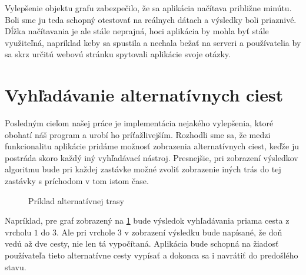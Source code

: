 Vylepšenie objektu grafu zabezpečilo, že sa aplikácia načítava približne minútu. Boli sme ju teda schopný otestovať na reálnych dátach a výsledky boli priaznivé. Dĺžka načítavania je ale stále neprajná, hoci aplikácia by mohla byť stále využiteľná, napríklad keby sa spustila a nechala bežať na serveri a používatelia by sa skrz určitú webovú stránku spytovali aplikácie svoje otázky.\newline


\section{Vyhľadávanie alternatívnych ciest}

Posledným cieľom našej práce je implementácia nejakého vylepšenia, ktoré obohatí náš program a urobí ho príťažlivejším. Rozhodli sme sa, že medzi funkcionalitu aplikácie pridáme možnosť zobrazenia alternatívnych ciest, keďže ju postráda skoro každý iný vyhľadávací nástroj. Presnejšie, pri zobrazení výsledkov algoritmu bude pri každej zastávke možné zvoliť zobrazenie iných trás do tej zastávky s príchodom v tom istom čase.\newline 

\begin{figure}[H]
  \caption{Príklad alternatívnej trasy}
  \label{alternativ_priklad}
\end{figure}

Napríklad, pre graf zobrazený na \ref{alternativ_priklad} bude výsledok vyhľadávania priama cesta z vrcholu $1$ do $3$. Ale pri vrchole $3$ v zobrazení výsledku bude napísané, že doň vedú až dve cesty, nie len tá vypočítaná. Aplikácia bude schopná na žiadosť používateľa tieto alternatívne cesty vypísať a dokonca sa i navrátiť do predošlého stavu.\newline

